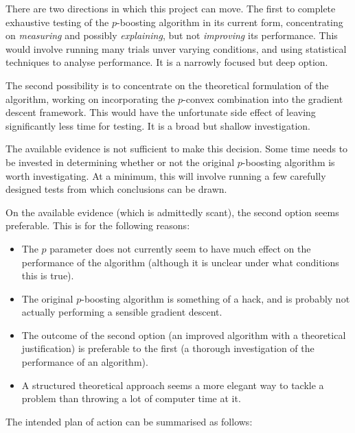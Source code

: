 

There are two directions in which this project can move.  The
first to complete exhaustive testing of the $p$-boosting algorithm
in its current form, 
concentrating on \emph{measuring} and possibly \emph{explaining}, but
not \emph{improving} its performance.  This would involve running many
trials unver varying conditions, and using statistical techniques to
analyse performance.  It is a narrowly focused but deep option.

The second possibility is to concentrate on the theoretical
formulation of the algorithm, working on incorporating the $p$-convex
combination into the gradient descent framework.  This would have the
unfortunate side effect of leaving significantly less time for
testing.  It is a broad but shallow investigation.

The available evidence is not sufficient to make this decision.  Some
time needs to be invested in determining whether or not the original
$p$-boosting algorithm is worth investigating.  At a minimum, this
will involve running a few carefully designed tests from which
conclusions can be drawn.

On the available evidence (which is admittedly scant), the second
option seems preferable.  This is for the following reasons:

\begin{itemize}

\item	The $p$ parameter does not currently seem to have much effect
	on the performance of the algorithm (although it is unclear
	under what conditions this is true).

\item	The original $p$-boosting algorithm is something of a hack,
	and is probably not actually performing a sensible gradient
	descent.

\item	The outcome of the second option (an improved algorithm with a
	theoretical justification) is preferable to the first (a
	thorough investigation of the performance of an algorithm).

\item	A structured theoretical approach seems a more elegant way to
	tackle a problem than throwing a lot of computer time at it.

\end{itemize}

The intended plan of action can be summarised as follows:

